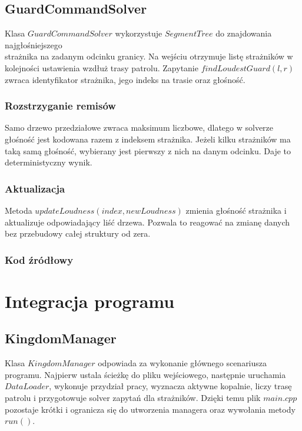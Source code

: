 \documentclass{article}
\begin{document}
\subsection{GuardCommandSolver}
Klasa $GuardCommandSolver$ wykorzystuje $SegmentTree$ do znajdowania najgłośniejszego \\ strażnika na zadanym odcinku granicy. Na wejściu otrzymuje listę strażników w kolejności ustawienia wzdłuż trasy patrolu. Zapytanie $findLoudestGuard(l, r)$ zwraca identyfikator strażnika, jego indeks na trasie oraz głośność.

\subsubsection{Rozstrzyganie remisów}
Samo drzewo przedziałowe zwraca maksimum liczbowe, dlatego w solverze głośność jest kodowana razem z indeksem strażnika. Jeżeli kilku strażników ma taką samą głośność, wybierany jest pierwszy z nich na danym odcinku. Daje to deterministyczny wynik.

\subsubsection{Aktualizacja}
Metoda $updateLoudness(index, newLoudness)$ zmienia głośność strażnika i aktualizuje odpowiadający liść drzewa. Pozwala to reagować na zmianę danych bez przebudowy całej struktury od zera.

\subsubsection{Kod źródłowy}



\section{Integracja programu}

\subsection{KingdomManager}
Klasa $KingdomManager$ odpowiada za wykonanie głównego scenariusza programu. Najpierw ustala ścieżkę do pliku wejściowego, następnie uruchamia $DataLoader$, wykonuje przydział pracy, wyznacza aktywne kopalnie, liczy trasę patrolu i przygotowuje solver zapytań dla strażników. Dzięki temu plik $main.cpp$ pozostaje krótki i ogranicza się do utworzenia managera oraz wywołania metody $run()$.
\end{document}
